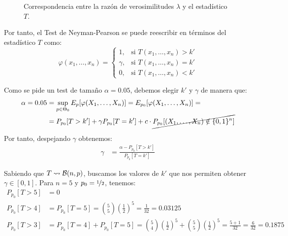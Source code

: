 \begin{ejemplo}
\begin{figure}[ht]
        \caption{Correspondencia entre la razón de verosimilitudes $\lambda$ y el estadístico $T$.}
        \label{fig:razon_verosimilitudes}
    \end{figure}
    
    Por tanto, el Test de Neyman-Pearson se puede reescribir en términos del estadístico $T$ como:
    \begin{equation*}
        \varphi(x_1, \dots, x_n) =
        \begin{cases}
            1, & \text{si } T(x_1, \dots, x_n) > k' \\
            \gamma, & \text{si } T(x_1, \dots, x_n) = k' \\
            0, & \text{si } T(x_1, \dots, x_n) < k'
        \end{cases}
    \end{equation*}

    Como se pide un test de tamaño $\alpha = 0.05$, debemos elegir $k'$ y $\gamma$ de manera que:
    \begin{align*}
        \alpha = 0.05 &= \sup_{p\in \Theta_0} E_{p}[\varphi(X_1, \dots, X_n)] = E_{p_0}[\varphi(X_1, \dots, X_n)] = \\&= P_{p_0}[T > k'] + \gamma P_{p_0}[T = k'] + c\cdot \cancel{P_{p_0}[(X_1, \dots, X_n) \notin \{0,1\}^n]}
    \end{align*}

    Por tanto, despejando $\gamma$ obtenemos:
    \begin{align*}
        \gamma &= \frac{\alpha - P_{p_0}[T > k']}{P_{p_0}[T = k']}
    \end{align*}


    Sabiendo que $T \rightsquigarrow \mathcal{B}(n, p)$, buscamos los valores de $k'$ que nos permiten obtener $\gamma\in [0,1]$. Para $n=5$ y $p_0 = \nicefrac{1}{2}$, tenemos:
    \begin{align*}
        P_{p_0}[T > 5] &= 0 \\
        P_{p_0}[T > 4] &= P_{p_0}[T = 5] = \binom{5}{5}\left(\frac{1}{2}\right)^5 = \frac{1}{32} = 0.03125 \\
        P_{p_0}[T > 3] &= P_{p_0}[T = 4] + P_{p_0}[T = 5] = \binom{5}{4}\left(\frac{1}{2}\right)^5 + \binom{5}{5}\left(\frac{1}{2}\right)^5 = \frac{5 + 1}{32} = \frac{6}{32} = 0.1875
    \end{align*}


\end{ejemplo}
